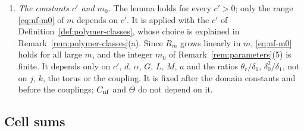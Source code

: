 \begin{remark}
\begin{enumerate}[label=(\alph*)]
\item \emph{The constants $c'$ and $m_0$.} The lemma holds for every $c'>0$; only the range \eqref{eq:nf-m0} of $m$ depends on $c'$. It is applied with the $c'$ of Definition~\ref{def:polymer-classes}, whose choice is explained in Remark~\ref{rem:polymer-classes}(a). Since $R_m$ grows linearly in $m$, \eqref{eq:nf-m0} holds for all large $m$, and the integer $m_0$ of Remark~\ref{rem:parameters}(5) is finite. It depends only on $c'$, $d$, $\alpha$, $G$, $L$, $M$, $a$ and the ratios $\theta_r/\delta_1$, $\delta_0^2/\delta_1$, not on $j$, $k$, the torus or the coupling. It is fixed after the domain constants and before the couplings; $C_{\rm nf}$ and $\Theta$ do not depend on it.
\end{enumerate}
\end{remark}

\subsection{Cell sums}\label{subsec:extraction-cells}

